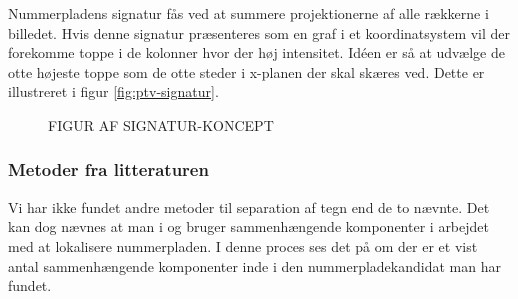 
Nummerpladens signatur fås ved at summere projektionerne af alle rækkerne i billedet. Hvis denne signatur præsenteres som en graf i et koordinatsystem vil der forekomme toppe i de kolonner hvor der høj intensitet. Idéen er så at udvælge de otte højeste toppe som de otte steder i x-planen der skal skæres ved. Dette er illustreret i figur \vref{fig:ptv-signatur}.

\begin{figure}[htp]
  \centering
  \caption{FIGUR AF SIGNATUR-KONCEPT}
  \label{fig:ptv-signatur}
\end{figure}

\subsubsection{Metoder fra litteraturen}

Vi har ikke fundet andre metoder til separation af tegn end de to nævnte. Det kan dog nævnes at man i \cite{parker} og \cite{kwas} bruger sammenhængende komponenter i arbejdet med at lokalisere nummerpladen. I denne proces ses det på om der er et vist antal sammenhængende komponenter inde i den nummerpladekandidat man har fundet.

